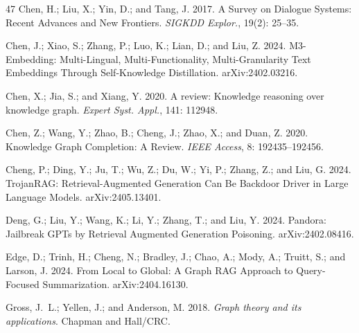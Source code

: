\documentclass[letterpaper]{article} %
\begin{document}
\begin{thebibliography}{47}
    Chen, H.; Liu, X.; Yin, D.; and Tang, J. 2017.
    \newblock A Survey on Dialogue Systems: Recent Advances and New Frontiers.
    \newblock \emph{{SIGKDD} Explor.}, 19(2): 25--35.
    
    Chen, J.; Xiao, S.; Zhang, P.; Luo, K.; Lian, D.; and Liu, Z. 2024.
     M3-Embedding: Multi-Lingual, Multi-Functionality, Multi-Granularity Text Embeddings Through Self-Knowledge Distillation.
    \newblock arXiv:2402.03216.
    
    Chen, X.; Jia, S.; and Xiang, Y. 2020.
    \newblock A review: Knowledge reasoning over knowledge graph.
    \newblock \emph{Expert Syst. Appl.}, 141: 112948.
    
    Chen, Z.; Wang, Y.; Zhao, B.; Cheng, J.; Zhao, X.; and Duan, Z. 2020.
    \newblock Knowledge Graph Completion: {A} Review.
    \newblock \emph{{IEEE} Access}, 8: 192435--192456.
    
    Cheng, P.; Ding, Y.; Ju, T.; Wu, Z.; Du, W.; Yi, P.; Zhang, Z.; and Liu, G. 2024.
    \newblock TrojanRAG: Retrieval-Augmented Generation Can Be Backdoor Driver in Large Language Models.
    \newblock arXiv:2405.13401.
    
    Deng, G.; Liu, Y.; Wang, K.; Li, Y.; Zhang, T.; and Liu, Y. 2024.
    \newblock Pandora: Jailbreak GPTs by Retrieval Augmented Generation Poisoning.
    \newblock arXiv:2402.08416.
    
    Edge, D.; Trinh, H.; Cheng, N.; Bradley, J.; Chao, A.; Mody, A.; Truitt, S.; and Larson, J. 2024.
    \newblock From Local to Global: {A} Graph {RAG} Approach to Query-Focused Summarization.
    \newblock arXiv:2404.16130.
    
    Gross, J.~L.; Yellen, J.; and Anderson, M. 2018.
    \newblock \emph{Graph theory and its applications}.
    \newblock Chapman and Hall/CRC.
    

\end{thebibliography}
\end{document}
